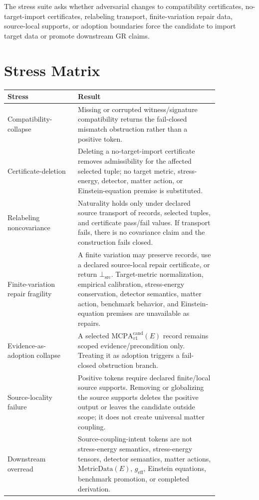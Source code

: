 \documentclass[11pt]{article}
\newcommand{\MetricData}{\mathrm{MetricData}}
\newcommand{\geff}{g_{\mathrm{eff}}}
\newcommand{\MCPA}{\mathrm{MCPA}^{\mathrm{cand}}_{v1}}
\newcommand{\BottomSrc}{\bot_{\mathrm{src}}}
\begin{document}
The stress suite asks whether adversarial changes to compatibility
certificates, no-target-import certificates, relabeling transport,
finite-variation repair data, source-local supports, or adoption boundaries
force the candidate to import target data or promote downstream GR claims.

\section{Stress Matrix}

\begin{longtable}{p{0.28\linewidth}p{0.56\linewidth}}
\toprule
Stress & Result \\
\midrule
Compatibility-collapse & Missing or corrupted witness/signature compatibility returns the fail-closed mismatch obstruction rather than a positive token. \\
Certificate-deletion & Deleting a no-target-import certificate removes admissibility for the affected selected tuple; no target metric, stress-energy, detector, matter action, or Einstein-equation premise is substituted. \\
Relabeling noncovariance & Naturality holds only under declared source transport of records, selected tuples, and certificate pass/fail values. If transport fails, there is no covariance claim and the construction fails closed. \\
Finite-variation repair fragility & A finite variation may preserve records, use a declared source-local repair certificate, or return \(\BottomSrc\). Target-metric normalization, empirical calibration, stress-energy conservation, detector semantics, matter action, benchmark behavior, and Einstein-equation premises are unavailable as repairs. \\
Evidence-as-adoption collapse & A selected \(\MCPA(E)\) record remains scoped evidence/precondition only. Treating it as adoption triggers a fail-closed obstruction branch. \\
Source-locality failure & Positive tokens require declared finite/local source supports. Removing or globalizing the source supports deletes the positive output or leaves the candidate outside scope; it does not create universal matter coupling. \\
Downstream overread & Source-coupling-intent tokens are not stress-energy semantics, stress-energy tensors, detector semantics, matter actions, \(\MetricData(E)\), \(\geff\), Einstein equations, benchmark promotion, or completed derivation. \\
\bottomrule
\end{longtable}
\end{document}
